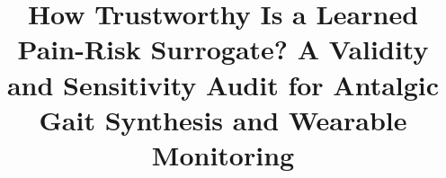 \documentclass[conference]{IEEEtran}
\begin{document}

\title{How Trustworthy Is a Learned Pain-Risk Surrogate? A Validity and Sensitivity Audit for Antalgic Gait Synthesis and Wearable Monitoring}

\author{}

\maketitle












\end{document}
